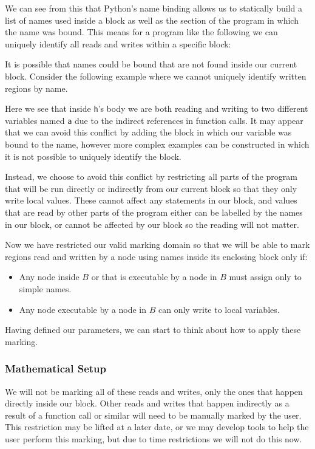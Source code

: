 \documentclass[twoside,a4paper]{report}
\begin{document}
We can see from this that Python's name binding allows us to statically build a list of names used inside a block as well as the section of the program in
which the name was bound. This means for a program like the following we can uniquely identify all reads and writes within a specific block:



It is possible that names could be bound that are not found inside our current block. Consider the following example where we cannot uniquely identify
written regions by name.



Here we see that inside \texttt{h}'s body we are both reading and writing to two different variables named \texttt{a} due to the indirect references in
function calls. It may appear that we can avoid this conflict by adding the block in which our variable was bound to the name, however more complex
examples can be constructed in which it is not possible to uniquely identify the block.

Instead, we choose to avoid this conflict by restricting all parts of the program that will be run directly or indirectly from our current block so that
they only write local values. These cannot affect any statements in our block, and values that are read by other parts of the program either can be labelled
by the names in our block, or cannot be affected by our block so the reading will not matter.

Now we have restricted our valid marking domain so that we will be able to mark regions read and written by a node using names inside its enclosing block
only if:

\begin{itemize}
\item Any node inside $B$ or that is executable by a node in $B$ must assign only to simple names.
\item Any node executable by a node in $B$ can only write to local variables.
\end{itemize}

Having defined our parameters, we can start to think about how to apply these marking.

\subsubsection{Mathematical Setup}

We will not be marking all of these reads and writes, only the ones that happen directly inside our block. Other reads and writes that happen indirectly as a
result of a function call or similar will need to be manually marked by the user. This restriction may be lifted at a later date, or we may develop tools to help
the user perform this marking, but due to time restrictions we will not do this now.
\end{document}
